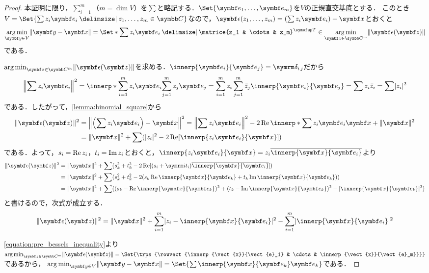 \documentclass[../../main]{subfiles}
\begin{document}
\begin{proof}
  本証明に限り，\(\sum_{i=1}^m\)（\(m=\dim V\)）を\(\sum\)と略記する．\(\Set{\vect{e}_1,\dots,\vect{e}_m}\)を\(V\)の正規直交基底とする．
  このとき\(V=\Set{\sum z_i\vect{e}_i\given z_1,\dots,z_m\in\numset{C}}\)なので，\(\vect{\epsilon}(z_1,\dots,z_m)=(\sum z_i\vect{e}_i)-\vect{x}\)とおくと
  \[
    \argmin_{\vect{y}\in V}\vnorm{\vect{y}-\vect{x}} = \Set*{\sum z_i\vect{e}_i\given\trps{\matrice{z_1 & \cdots & z_m}}\in\argmin_{\vect{z}\in\numset{C}^m}\vnorm{\vect{\epsilon}(\vect{z})}}
  \]
  である．

  \(\argmin_{\vect{z}\in\numset{C}^m}\vnorm{\vect{\epsilon}(\vect{z})}\)を求める．\(\innerp{\vect{e}_i}{\vect{e}_j}=\kdelta{i}{j}\)だから
  \[
    \vnorm*{\sum z_i\vect{e}_i}^2 = \innerp*{\sum_{i=1}^mz_i\vect{e}_i}{\sum_{j=1}^mz_j\vect{e}_j}
    = \sum_{i=1}^mz_i\sum_{j=1}^m\conj{z}_j\innerp{\vect{e}_i}{\vect{e}_j}
    = \sum z_i\conj{z}_i
    = \sum\abs{z_i}^2
  \]
  である．したがって，\cref{lemma:binomial_square}から
  \begin{align*}
    \vnorm{\vect{\epsilon}(\vect{z})}^2 &= \vnorm*{\pqty*{\sum z_i\vect{e}_i}-\vect{x}}^2
    = \vnorm*{\sum z_i\vect{e}_i}^2-2\rpart\innerp*{\sum z_i\vect{e}_i}{\vect{x}}+\vnorm{\vect{x}}^2 \\
    &= \vnorm{\vect{x}}^2+\sum(\abs{z_i}^2-2\rpart[\innerp{z_i\vect{e}_i}{\vect{x}}])
  \end{align*}
  である．よって，\(s_i=\operatorname{Re} z_i\)，\(t_i=\operatorname{Im} z_i\)とおくと，\(\innerp{z_i\vect{e}_i}{\vect{x}}=z_i\conj*{\innerp{\vect{x}}{\vect{e}_i}}\)より
  \begin{align*}
    \vnorm{\vect{\epsilon}(\vect{z})}^2 &= \vnorm{\vect{x}}^2+\sum(s_k^2+t_k^2-2\rpart[(s_i+\iuni t_i)\conj*{\innerp{\vect{x}}{\vect{e}_i}}]) \\
    &= \vnorm{\vect{x}}^2+\sum(s_k^2+t_k^2-2(s_k\rpart\innerp{\vect{x}}{\vect{e}_k}+t_k\ipart\innerp{\vect{x}}{\vect{e}_k})) \\
    &= \vnorm{\vect{x}}^2+\sum((s_k-\rpart\innerp{\vect{x}}{\vect{e}_k})^2+(t_k-\ipart\innerp{\vect{x}}{\vect{e}_k})^2-\abs{\innerp{\vect{x}}{\vect{e}_k}}^2)
  \end{align*}
  と書けるので，次式が成立する．
  \begin{equation}
    \label{equation:pre_bessels_inequality}
    \vnorm{\vect{\epsilon}(\vect{z})}^2 = \vnorm{\vect{x}}^2+\sum_{i=1}^m\abs{z_i-\innerp{\vect{x}}{\vect{e}_i}}^2-\sum_{i=1}^m\abs{\innerp{\vect{x}}{\vect{e}_i}}^2
  \end{equation}

  \cref{equation:pre_bessels_inequality}より\(\argmin_{\vect{z}\in\numset{C}^m}\vnorm{\vect{\epsilon}(\vect{z})}=\Set{\trps{\rowvect{\innerp{\vect{x}}{\vect{e}_1} & \cdots & \innerp{\vect{x}}{\vect{e}_m}}}}\)であるから，
  \(\argmin_{\vect{y}\in V}\vnorm{\vect{y}-\vect{x}}=\Set{\sum\innerp{\vect{x}}{\vect{e}_k}\vect{e}_k}\)である．
\end{proof}
\end{document}
